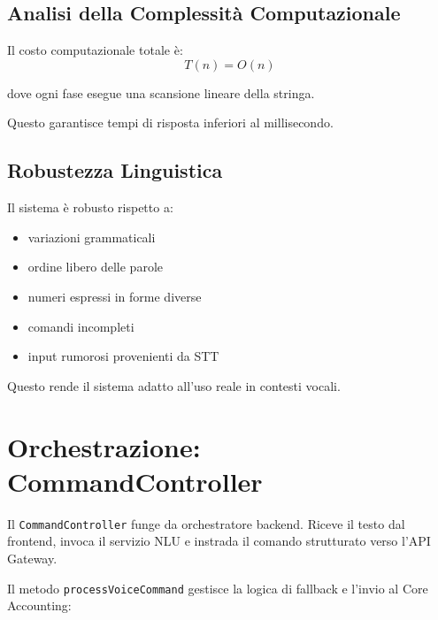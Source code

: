 \subsection{Analisi della Complessità Computazionale}

Il costo computazionale totale è:
\[
    T(n) =
    O(n)
\]

dove ogni fase esegue una scansione lineare della stringa.

Questo garantisce tempi di risposta inferiori al millisecondo.

\subsection{Robustezza Linguistica}

Il sistema è robusto rispetto a:

\begin{itemize}
    \item variazioni grammaticali
    \item ordine libero delle parole
    \item numeri espressi in forme diverse
    \item comandi incompleti
    \item input rumorosi provenienti da STT
\end{itemize}

Questo rende il sistema adatto all'uso reale in contesti vocali.

\newpage

\section{Orchestrazione: CommandController}

Il \texttt{CommandController} funge da orchestratore backend. Riceve il testo dal frontend, invoca il servizio NLU e instrada il comando strutturato verso l'API Gateway.

Il metodo \texttt{processVoiceCommand} gestisce la logica di fallback e l'invio al Core Accounting:

\bigskip

